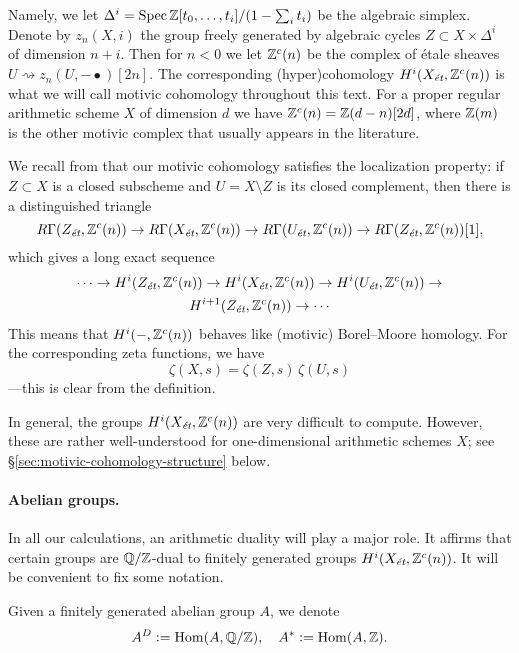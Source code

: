 \documentclass[draft]{article}
\numberwithin{equation}{section}
\begin{document}
Namely, we let $\Delta^i = \Spec \ZZ [t_0,\ldots,t_i] / (1 - \sum_i t_i)$ be the
algebraic simplex. Denote by $z_n (X, i)$ the group freely generated by
algebraic cycles $Z \subset X \times \Delta^i$ of dimension $n+i$. Then for
$n < 0$ we let $\ZZ^c (n)$ be the complex of \'{e}tale sheaves
$U \rightsquigarrow z_n (U, -\bullet) [2n]$. The corresponding (hyper)cohomology
$H^i (X_\et, \ZZ^c (n))$ is what we will call motivic cohomology throughout this
text. For a proper regular arithmetic scheme $X$ of dimension $d$ we have
$\ZZ^c (n) = \ZZ (d-n) [2d]$, where $\ZZ (m)$ is the other motivic complex that
usually appears in the literature.

We recall from \cite[Corollary~7.2]{Geisser-2010} that our motivic cohomology
satisfies the localization property: if $Z \subset X$ is a closed subscheme and
$U = X\setminus Z$ is its closed complement, then there is a distinguished
triangle
\[ R\Gamma (Z_\et, \ZZ^c (n)) \to
  R\Gamma (X_\et, \ZZ^c (n)) \to
  R\Gamma (U_\et, \ZZ^c (n)) \to 
  R\Gamma (Z_\et, \ZZ^c (n)) [1], \]
which gives a long exact sequence
\begin{multline}
  \label{eqn:localization-les}
  \cdots \to H^i (Z_\et, \ZZ^c (n)) \to
  H^i (X_\et, \ZZ^c (n)) \to
  H^i (U_\et, \ZZ^c (n)) \to \\
  H^{i+1} (Z_\et, \ZZ^c (n)) \to \cdots
\end{multline}
This means that $H^i (-, \ZZ^c (n))$ behaves like (motivic) Borel--Moore
homology. For the corresponding zeta functions, we have
$$\zeta (X,s) = \zeta (Z,s)\,\zeta (U,s)$$
---this is clear from the definition.

In general, the groups $H^i (X_\et, \ZZ^c (n))$ are very difficult to
compute. However, these are rather well-understood for one-dimensional
arithmetic schemes $X$; see \S\ref{sec:motivic-cohomology-structure} below.

\paragraph{Abelian groups.}
In all our calculations, an arithmetic duality
\cite[Theorem~I]{Beshenov-Weil-etale-1} will play a major role. It affirms that
certain groups are $\QQ/\ZZ$-dual to finitely generated groups
$H^i (X_\et, \ZZ^c(n))$. It will be convenient to fix some notation.

\begin{definition}
  \label{dfn:A-D-and-A-star}
  Given a finitely generated abelian group $A$, we denote
  \[ A^D \dfn \Hom (A, \QQ/\ZZ), \quad
    A^* \dfn \Hom (A, \ZZ). \]
\end{definition}
\end{document}
